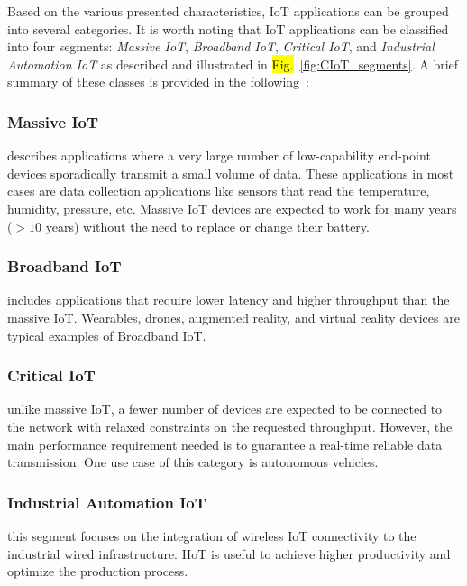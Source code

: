 \documentclass[]{IEEEtran}
\begin{document}
Based on the various presented characteristics, IoT applications can be grouped into several categories.
It is worth noting that IoT applications can be classified into four segments: \textit{Massive IoT}, \textit{Broadband IoT}, \textit{Critical IoT}, and \textit{Industrial Automation IoT} as described and illustrated in \hl{Fig.}~\ref{fig:CIoT_segments}.
A brief summary of these classes is provided in the following~\cite{zaidi_cellular_2020}:

\subsubsection{Massive IoT}
describes applications where a very large number of low-capability end-point devices sporadically transmit a small volume of data.
These applications in most cases are data collection applications like sensors that read the temperature, humidity, pressure, etc.
Massive IoT devices are expected to work for many years ($>10$ years) without the need to replace or change their battery.

\subsubsection{Broadband IoT}
includes applications that require lower latency and higher throughput than the massive IoT. Wearables, drones, augmented reality, and virtual reality devices are typical examples of Broadband IoT.

\subsubsection{Critical IoT}
unlike massive IoT, a fewer number of devices are expected to be connected to the network with relaxed constraints on the requested throughput.
However, the main performance requirement needed is to guarantee a real-time reliable data transmission.
One use case of this category is autonomous vehicles.

\subsubsection{Industrial Automation IoT}
this segment focuses on the integration of wireless IoT connectivity to the industrial wired infrastructure. IIoT is useful to achieve higher productivity and optimize the production process.
\end{document}
